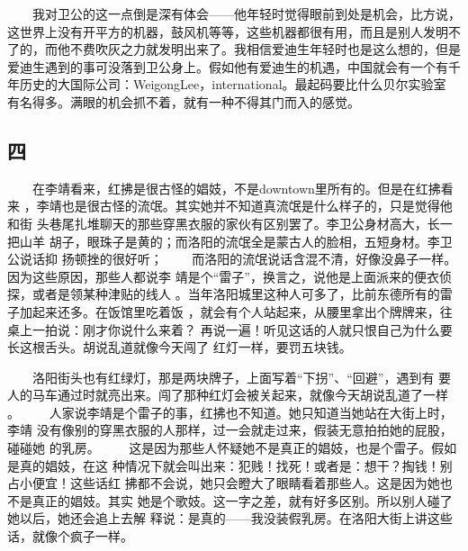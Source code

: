  　　我对卫公的这一点倒是深有体会——他年轻时觉得眼前到处是机会，比方说， 这世界上没有开平方的机器，鼓风机等等，这些机器都很有用，而且是别人发明不 了的，而他不费吹灰之力就发明出来了。我相信爱迪生年轻时也是这么想的，但是 爱迪生遇到的事可没落到卫公身上。假如他有爱迪生的机遇，中国就会有一个有千 年历史的大国际公司：WeigongLee，international。最起码要比什么贝尔实验室 有名得多。满眼的机会抓不着，就有一种不得其门而入的感觉。 
 
 
\subsection{四} 
 
 　　在李靖看来，红拂是很古怪的娼妓，不是downtown里所有的。但是在红拂看来 ，李靖也是很古怪的流氓。其实她并不知道真流氓是什么样子的，只是觉得他和街 头巷尾扎堆聊天的那些穿黑衣服的家伙有区别罢了。李卫公身材高大，长一把山羊 胡子，眼珠子是黄的；而洛阳的流氓全是蒙古人的脸相，五短身材。李卫公说话抑 扬顿挫的很好听； 　　而洛阳的流氓说话含混不清，好像没鼻子一样。因为这些原因，那些人都说李 靖是个“雷子”，换言之，说他是上面派来的便衣侦探，或者是领某种津贴的线人 。当年洛阳城里这种人可多了，比前东德所有的雷子加起来还多。在饭馆里吃着饭 ，就会有个人站起来，从腰里拿出个牌牌来，往桌上一拍说：刚才你说什么来着？ 再说一遍！听见这话的人就只恨自己为什么要长这根舌头。胡说乱道就像今天闯了 红灯一样，要罚五块钱。 

　　洛阳街头也有红绿灯，那是两块牌子，上面写着“下拐”、“回避”，遇到有 要人的马车通过时就亮出来。闯了那种红灯会被关起来，就像今天胡说乱道了一样 。 　　人家说李靖是个雷子的事，红拂也不知道。她只知道当她站在大街上时，李靖 没有像别的穿黑衣服的人那样，过一会就走过来，假装无意拍拍她的屁股，碰碰她 的乳房。 　　这是因为那些人怀疑她不是真正的娼妓，也是个雷子。假如是真的娼妓，在这 种情况下就会叫出来：犯贱！找死！或者是：想干？掏钱！别占小便宜！这些话红 拂都不会说，她只会瞪大了眼睛看着那些人。这是因为她也不是真正的娼妓。其实 她是个歌妓。这一字之差，就有好多区别。所以别人碰了她以后，她还会追上去解 释说：是真的——我没装假乳房。在洛阳大街上讲这些话，就像个疯子一样。

